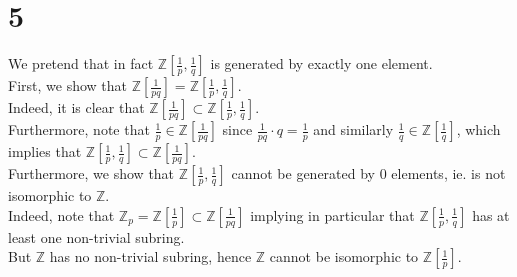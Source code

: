 \documentclass[11pt, a4paper]{article}
\begin{document}
\section*{5}
We pretend that in fact $ \mathbb{Z}\left[ \frac{1}{p}, \frac{1}{q}\right]$ is generated by exactly one element.\\
First, we show that $ \mathbb{Z}[ \frac{1}{pq}]= \mathbb{Z}\left[ \frac{1}{p}, \frac{1}{q}\right]$.\\
Indeed, it is clear that $ \mathbb{Z}[ \frac{1}{pq}] \subset \mathbb{Z} \left[  \frac{1}{p}, \frac{1}{q}\right] $.\\
Furthermore, note that $ \frac{1}{p}\in \mathbb{Z}\left[ \frac{1}{pq}\right] $ since $ \frac{1}{pq}\cdot q = \frac{1}{p}$ and similarly $ \frac{1}{q}\in \mathbb{Z}\left[\frac{1}{q}\right] $, which implies that $ \mathbb{Z}\left[\frac{1}{p}, \frac{1}{q}\right] \subset \mathbb{Z}\left[\frac{1}{pq}\right]$.\\

Furthermore, we show that $ \mathbb{Z}\left[ \frac{1}{p},\frac{1}{q}\right]$ cannot be generated by 0 elements, ie. is not isomorphic to $\mathbb{Z}$.\\
Indeed, note that $ \mathbb{Z}_p = \mathbb{Z}\left[\frac{1}{p}\right] \subset \mathbb{Z}\left[ \frac{1}{pq}\right]$ implying in particular that $ \mathbb{Z}\left[ \frac{1}{p}, \frac{1}{q}\right] $ has at least one non-trivial subring.\\
But $ \mathbb{Z}$ has no non-trivial subring, hence $ \mathbb{Z}$ cannot be isomorphic to $ \mathbb{Z} \left[  \frac{1}{p}\right] $.
\end{document}
